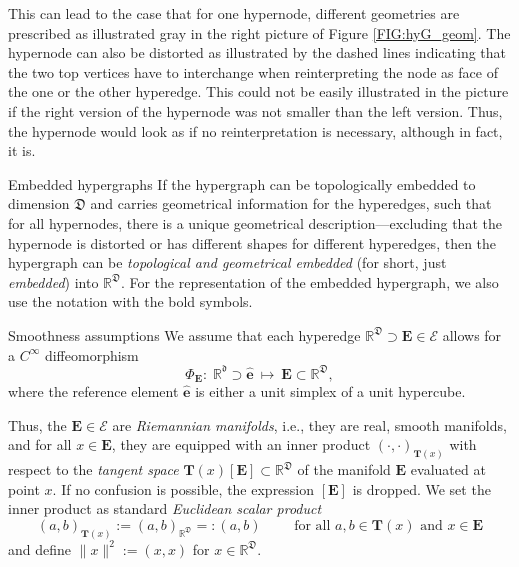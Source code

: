 \documentclass[a4paper, english, 12pt, reqno, draft]{amsart}
\makeatletter
\theoremstyle{definition}
\theoremstyle{remark}
\numberwithin{equation}{section}
\newcommand{\SetEdge}{\ensuremath{\boldsymbol{\mathcal E}}}
\newcommand{\Edge}{{\ensuremath{\boldsymbol E}}}
\newcommand{\RefEdge}{{\ensuremath{\widehat{\boldsymbol e}}}}
\newcommand{\locDim}{\ensuremath{\mathfrak d}}
\newcommand{\globDim}{\ensuremath{\mathfrak D}}
\newcommand{\tangent}{\ensuremath{{\boldsymbol T}}}
\newcommand{\diffeo}{\ensuremath{\Phi}}
\newcommand{\IR}{\ensuremath{\mathbb R}}
\def\paragraph{\@startsection{paragraph}{4}%
  \z@\z@{-\fontdimen2\font}%
  {\normalfont\scshape}}
\makeatother
\begin{document}
This can lead to the case that for one hypernode, different geometries are prescribed as illustrated gray in the right picture of Figure \ref{FIG:hyG_geom}. The hypernode can also be distorted as illustrated by the dashed lines indicating that the two top vertices have to interchange when reinterpreting the node as face of the one or the other hyperedge. This could not be easily illustrated in the picture if the right version of the hypernode was not smaller than the left version. Thus, the hypernode would look as if no reinterpretation is necessary, although in fact, it is.

\paragraph{Embedded hypergraphs}
% 
If the hypergraph can be topologically embedded to dimension $\globDim$ and carries geometrical information for the hyperedges, such that for all hypernodes, there is a unique geometrical description---excluding that the hypernode is distorted or has different shapes for different hyperedges, then the hypergraph can be \emph{topological and geometrical embedded} (for short, just \emph{embedded}) into $\IR^\globDim$. For the representation of the embedded hypergraph, we also use the notation with the bold symbols.

\paragraph{Smoothness assumptions}
% 
We assume that each hyperedge $\IR^\globDim \supset \Edge \in \SetEdge$ allows for a $C^\infty$ diffeomorphism
% 
\begin{equation*}
 \diffeo_\Edge \colon \; \IR^\locDim \supset \RefEdge ~\mapsto~ \Edge \subset \IR^\globDim,
\end{equation*}
% 
where the reference element $\RefEdge$ is either a unit simplex of a unit hypercube.

Thus, the $\Edge\in \SetEdge$ are \emph{Riemannian manifolds}, i.e., they are real, smooth manifolds, and for all $x \in \Edge$, they are equipped with an inner product $(\cdot,\cdot)_{\tangent(x)}$ with respect to the \emph{tangent space} $\tangent(x)[\Edge] \subset \IR^\globDim$ of the manifold $\Edge$ evaluated at point $x$. If no confusion is possible, the expression $[\Edge]$ is dropped. We set the inner product as standard \emph{Euclidean scalar product}
% 
\begin{equation*}
 (a,b)_{\tangent(x)} := (a,b)_{\IR^\globDim} =: (a,b) \qquad \text{ for all } a,b \in \tangent(x) \text{ and } x \in \Edge
\end{equation*}
% 
and define $\| x \|^2 := (x,x)$ for $x \in \IR^\globDim$.
\end{document}
